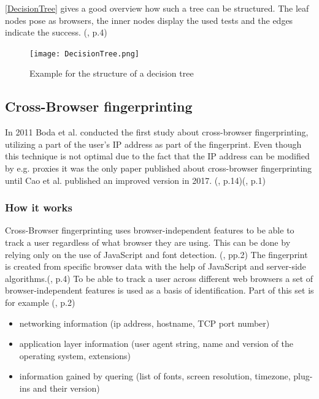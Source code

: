 \autoref{DecisionTree} gives a good overview how such a tree can be structured. The leaf nodes pose as browsers, the inner nodes display the used tests and the edges indicate the success. (\textcite{mulazzani13}, p.4)
\begin{figure}[H]
	\centering
	\texttt{[image: DecisionTree.png]}
	\caption{Example for the structure of a decision tree}
	\label{DecisionTree}
\end{figure}

\subsection{Cross-Browser fingerprinting}
In 2011 Boda et al. conducted the first study about cross-browser fingerprinting, utilizing a part of the user's IP address as part of the fingerprint. Even though this technique is not optimal due to the fact that the IP address can be modified by e.g. proxies it was the only paper published about cross-browser fingerprinting until Cao et al. published an improved version in 2017. (\textcite{boda11}, p.14)(\textcite{Cao17}, p.1)

\subsubsection{How it works}
Cross-Browser fingerprinting uses browser-independent features to be able to track a user regardless of what browser they are using. This can be done by relying only on the use of JavaScript and font detection. (\textcite{upi15}, pp.2)
The fingerprint is created from specific browser data with the help of JavaScript and server-side algorithms.(\textcite{boda11}, p.4)
To be able to track a user across different web browsers a set of browser-independent features is used as a basis of identification. Part of this set is for example (\textcite{boda11}, p.2)
\begin{itemize}
	\item networking information (ip address, hostname, TCP port number)
	\item application layer information (user agent string, name and version of the operating system, extensions)
	\item information gained by quering (list of fonts, screen resolution, timezone, plug-ins and their version)
\end{itemize}

